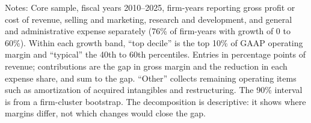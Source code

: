 \begin{table}[t]\centering\small
\caption{Where the distance to the frontier sits: operating-margin gap between firm-years near the frontier and typical firm-years at the same growth, by cost line}\label{tab:gap}
\par\vspace{2pt}\footnotesize\raggedright Notes: Core sample, fiscal years 2010--2025, firm-years reporting gross profit or cost of revenue, selling and marketing, research and development, and general and administrative expense separately (76\% of firm-years with growth of 0 to 60\%). Within each growth band, ``top decile'' is the top 10\% of GAAP operating margin and ``typical'' the 40th to 60th percentiles. Entries in percentage points of revenue; contributions are the gap in gross margin and the reduction in each expense share, and sum to the gap. ``Other'' collects remaining operating items such as amortization of acquired intangibles and restructuring. The 90\% interval is from a firm-cluster bootstrap. The decomposition is descriptive: it shows where margins differ, not which changes would close the gap.
\end{table}
